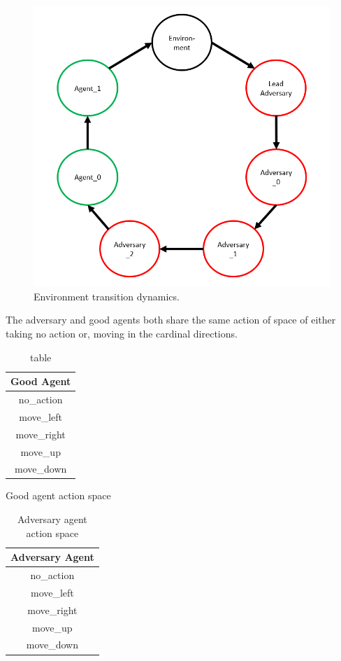 \documentclass{article}
\begin{document}
\clearpage

\begin{figure}[!ht]
  \centering
  \includegraphics[scale=0.5]{Cycle_diagram.png}
  \caption{Environment transition dynamics.}
  \label{fig:stepcycle}
\end{figure}

The adversary and good agents both share the same action of space of either taking no action or, moving in the cardinal directions.

\begin{table}[!ht]
  \centering
  \begin{tabular}{|c|}
  \hline
  Good Agent  \\ \hline
  no\_action  \\ \hline
  move\_left  \\ \hline
  move\_right \\ \hline
  move\_up    \\ \hline
  move\_down  \\ \hline
\end{tabular}
\caption{table}{Good agent action space}
\label{tab:good-agent-action}
\end{table}

\begin{table}[!ht]
  \centering
  \begin{tabular}{|c|}
    \hline
    Adversary Agent  \\ \hline
    no\_action  \\ \hline
    move\_left  \\ \hline
    move\_right \\ \hline
    move\_up    \\ \hline
    move\_down  \\ \hline
    \end{tabular}
    \caption{Adversary agent action space}
    \label{tab:adversary-agent-action}
  \end{table}
\end{document}

